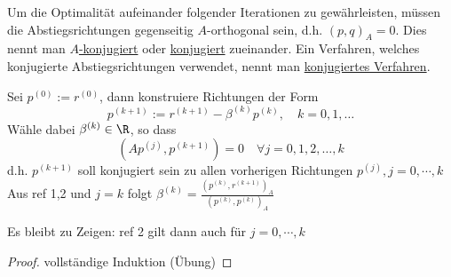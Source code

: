 \begin{folgerung}
  Um die Optimalität aufeinander folgender Iterationen zu gewährleisten, müssen die Abstiegsrichtungen gegenseitig $A$-orthogonal sein, d.h. $(p,q)_A=0$. Dies nennt man \underline{$A$-konjugiert} oder \underline{konjugiert} zueinander. Ein Verfahren, welches konjugierte Abstiegsrichtungen verwendet, nennt man \underline{konjugiertes Verfahren}.
\end{folgerung}

\begin{vorgehensweise}
  Sei $p^{(0)}:= r^{(0)}$, dann konstruiere Richtungen der Form 
  \begin{equation}
    p^{(k+1)}:=r^{(k+1)}-\beta^{(k)}p^{(k)}, \quad k=0,1,\dots
  \end{equation}
  Wähle dabei $\beta^{(k)} \in \R$, so dass 
  \begin{equation}
    (Ap^{(j)},p^{(k+1)})=0 \quad \forall j=0,1,2,\ldots,k
  \end{equation}
  d.h. $p^{(k+1)}$ soll konjugiert sein zu allen vorherigen Richtungen $p^{(j)}, j=0,\cdots,k$
  Aus ref 1,2 und $j=k$ folgt $\beta^{(k)}=\frac{(p^{(k)},r^{(k+1)})_A}{(p^{(k)},p^{(k)})_A}$
\end{vorgehensweise}

  Es bleibt zu Zeigen: ref 2 gilt dann auch für $j=0,\cdots,k$
  \begin{proof}
    vollständige Induktion (Übung)
  \end{proof}

